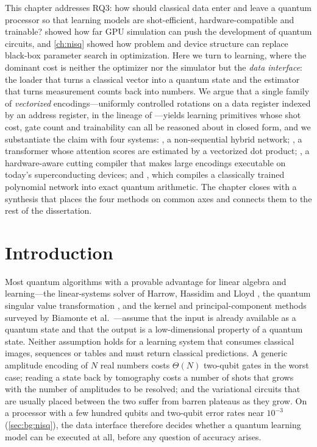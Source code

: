 This chapter addresses RQ3: how should classical data enter and leave a quantum processor so that learning models are shot-efficient, hardware-compatible and trainable?  showed how far GPU simulation can push the development of quantum circuits, and \cref{ch:nisq} showed how problem and device structure can replace black-box parameter search in optimization. Here we turn to learning, where the dominant cost is neither the optimizer nor the simulator but the \emph{data interface}: the loader that turns a classical vector into a quantum state and the estimator that turns measurement counts back into numbers. We argue that a single family of \emph{vectorized} encodings---uniformly controlled rotations on a data register indexed by an address register, in the lineage of \qcrank{} \cite{balewski2024qcrank}---yields learning primitives whose shot cost, gate count and trainability can all be reasoned about in closed form, and we substantiate the claim with four systems: \qpie{}, a non-sequential hybrid network; \vqt{}, a transformer whose attention scores are estimated by a vectorized dot product; \shardq{}, a hardware-aware cutting compiler that makes large encodings executable on today's superconducting devices; and \nnqa{}, which compiles a classically trained polynomial network into exact quantum arithmetic. The chapter closes with a synthesis that places the four methods on common axes and connects them to the rest of the dissertation.

\section{Introduction}\label{sec:qml:intro}

Most quantum algorithms with a provable advantage for linear algebra and learning---the linear-systems solver of Harrow, Hassidim and Lloyd \cite{harrow2009hhl}, the quantum singular value transformation \cite{gilyen2019qsvt}, and the kernel and principal-component methods surveyed by Biamonte et al.~\cite{biamonte2017qml}---assume that the input is already available as a quantum state and that the output is a low-dimensional property of a quantum state. Neither assumption holds for a learning system that consumes classical images, sequences or tables and must return classical predictions. A generic amplitude encoding of $N$ real numbers costs $\Theta(N)$ two-qubit gates in the worst case; reading a state back by tomography costs a number of shots that grows with the number of amplitudes to be resolved; and the variational circuits that are usually placed between the two suffer from barren plateaus \cite{mcclean2018barren} as they grow. On a processor with a few hundred qubits and two-qubit error rates near $10^{-3}$ (\cref{sec:bg:nisq}), the data interface therefore decides whether a quantum learning model can be executed at all, before any question of accuracy arises.

